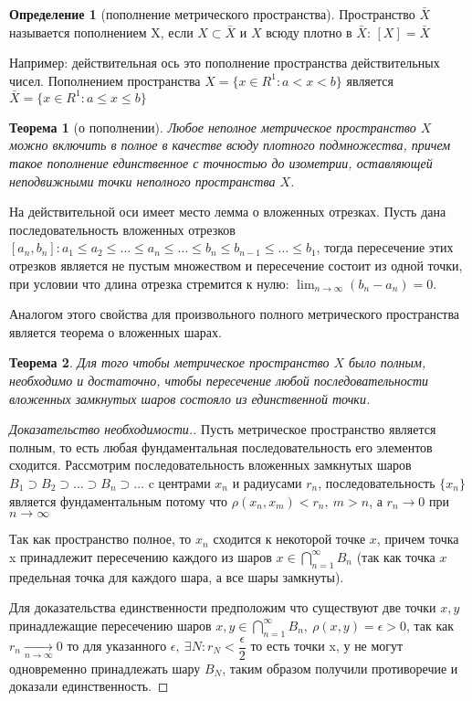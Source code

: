 \documentclass[14pt,a4paper]{extarticle}
\newtheorem{theorem}{Теорема}[section]
\theoremstyle{definition}
\newtheorem{definition}{Определение}[section]
\theoremstyle{remark}
\renewcommand{\[}{\begin{dmath*}[compact]}
\renewcommand{\]}{\end{dmath*}}
\newcommand{\ds}{\displaystyle}
\newcommand{\sep}{ , \ \allowbreak }
\newcommand\fr[2]{\dfrac{#1}{#2}}
\begin{document}
\begin{definition}[пополнение метрического пространства]
  Пространство $\bar X$ называется пополнением X, если $X \subset \bar{X}$ и $X$
  всюду плотно в $\bar X$: $[X] = \bar X$
\end{definition}

Например: действительная ось это пополнение пространства действительных чисел.
Пополнением пространства $X = \{x \in R^1: a < x < b\}$ является
$\bar{X} = \{x \in R^1: a \leq x \leq b\}$

\begin{theorem}[о пополнении]
\label{th:о пополнении}
  Любое неполное метрическое пространство $X$ можно
  включить в полное в качестве всюду плотного подмножества,
  причем такое пополнение единственное с точностью до изометрии,
  оставляющей неподвижными точки неполного пространства $X$.
\end{theorem}

На действительной оси имеет место лемма о вложенных отрезках. Пусть дана
последовательность вложенных отрезков $[a_n, b_n]: a_1 \leq a_2 \leq \dots \leq
a_n \leq \dots \leq b_n \leq b_{n-1} \leq \dots \leq b_1 $, тогда пересечение
этих отрезков является не пустым множеством и пересечение состоит из одной
точки, при условии что длина отрезка стремится к нулю:
$\ds \lim_{n \to \infty}(b_n - a_n) = 0$.

Аналогом этого свойства для произвольного полного метрического пространства
является теорема о вложенных шарах.

\begin{theorem}
  Для того чтобы метрическое пространство $X$ было полным,
  необходимо и достаточно, чтобы пересечение любой последовательности вложенных
  замкнутых шаров состояло из единственной точки.
\end{theorem}

\begin{proof}[Доказательство необходимости.]
  Пусть метрическое пространство является полным, то есть любая фундаментальная
  последовательность его элементов сходится. Рассмотрим последовательность
  вложенных замкнутых шаров
  $B_{1} \supset B_{2} \supset \dots \supset B_{n} \supset \dots$
  c центрами $x_{n}$ и радиусами $r_{n}$, последовательность $\{x_n\}$ является
  фундаментальным потому что $\rho(x_n, x_m) < r_n\sep m > n$,
  а $r_n \to 0$ при $n \to \infty$

  Так как пространство полное, то $x_{n}$ сходится к некоторой точке $x$,
  причем точка x принадлежит пересечению каждого из шаров
  $x \in \bigcap _{n = 1}^{\infty} B_{n}$ (так как точка $x$
  предельная точка для каждого шара, а все шары замкнуты).

  Для доказательства единственности предположим что существуют две точки $x, y$
  принадлежащие пересечению шаров
  $x, y \in \bigcap _{n = 1}^{\infty} B_{n} \sep \rho(x, y) = \epsilon > 0$,
  так как $r_n \underset{n \to \infty}{\to} 0$ то для указанного
  $\epsilon \sep \exists N: r_N < \fr\epsilon2$
  то есть точки x, у не могут одновременно принадлежать шару $B_N$, таким образом
  получили противоречие и доказали единственность.
\end{proof}
\end{document}
